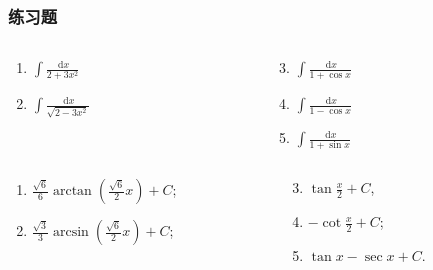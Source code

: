 \documentclass[
10pt,
aspectratio=43,
]{beamer}
\begin{document}
\begin{frame}
	\frametitle{练习题}
	\everymath{\displaystyle}
	\begin{block}{}
		\begin{columns}[onlytextwidth]
			\begin{column}{0.5\textwidth}
				\begin{enumerate}
					\item $\int \frac{\mathrm{~d} x}{2+3 x^2}$
					\item $\int \frac{\mathrm{~d} x}{\sqrt{2-3 x^2}}$
				\end{enumerate}
			\end{column}
			\begin{column}{0.5\textwidth}
				\begin{enumerate}
					\setcounter{enumi}{2}
					\item $\int \frac{\mathrm{~d} x}{1+\cos x}$
					\item $\int \frac{\mathrm{~d} x}{1-\cos x}$
					\item $\int \frac{\mathrm{~d} x}{1+\sin x}$
				\end{enumerate}
			\end{column}
		\end{columns}
	\end{block}
	\begin{exampleblock}{}
		\begin{columns}[onlytextwidth]
			\begin{column}{0.5\textwidth}
				\begin{enumerate}
					\pause \item $\frac{\sqrt{6}}{6}\arctan\left(\frac{\sqrt{6}}{2}x\right)+C$;
					      \pause \item $\frac{\sqrt{3}}{3} \arcsin \left(\frac{\sqrt{6}}{2} x\right)+C$;
				\end{enumerate}
			\end{column}
			\begin{column}{0.5\textwidth}
				\begin{enumerate}
					\setcounter{enumi}{2}
					\pause
					\item $\tan\frac{x}{2}+C$,
					      \pause
					\item $-\cot\frac{x}{2}+C$;
					      \pause
					\item $\tan x-\sec x +C$.
				\end{enumerate}
			\end{column}
		\end{columns}
	\end{exampleblock}
\end{frame}
\end{document}
